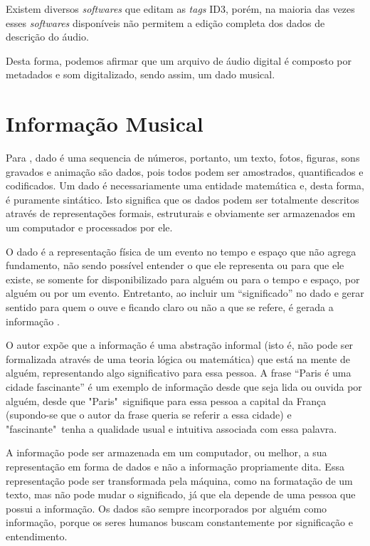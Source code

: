 Existem diversos \textit{softwares} que editam as \textit{tags} ID3, porém, na maioria das vezes esses \textit{softwares} disponíveis não permitem a edição completa dos dados de descrição do áudio.

Desta forma, podemos afirmar que um arquivo de áudio digital é composto por metadados e som digitalizado, sendo assim, um dado musical.

\section{Informação Musical} \label{sec:informacao-musical}
Para , dado é uma sequencia de números, portanto, um texto, fotos, figuras, sons gravados e animação são dados, pois todos podem ser amostrados, quantificados e codificados. Um dado é necessariamente uma entidade matemática e, desta forma, é puramente sintático. Isto significa que os dados podem ser totalmente descritos através de representações formais, estruturais e obviamente ser armazenados em um computador e processados por ele.

O dado é a representação física de um evento no tempo e espaço que não agrega fundamento, não sendo possível entender o que ele representa ou para que ele existe, se somente for disponibilizado para alguém ou para o tempo e espaço, por alguém ou por um evento.
Entretanto, ao incluir um “significado” no dado e gerar sentido para quem o ouve e ficando claro ou não a que se refere, é gerada a informação \cite{rafael2013}.

O autor  expõe que a informação é uma abstração informal (isto é, não pode ser formalizada através de uma teoria lógica ou matemática) que está na mente de alguém, representando algo significativo para essa pessoa. A frase “Paris é uma cidade fascinante” é um exemplo de informação desde que seja lida ou ouvida por alguém, desde que "Paris"\ signifique para essa pessoa a capital da França (supondo-se que o autor da frase queria se referir a essa cidade) e "fascinante"\ tenha a qualidade usual e intuitiva associada com essa palavra.

A informação pode ser armazenada em um computador, ou melhor, a sua representação em forma de dados e não a informação propriamente dita. Essa representação pode ser transformada pela máquina, como na formatação de um texto, mas não pode mudar o significado, já que ela depende de uma pessoa que possui a informação. Os dados são sempre incorporados por alguém como informação, porque os seres humanos buscam constantemente por significação e entendimento.

